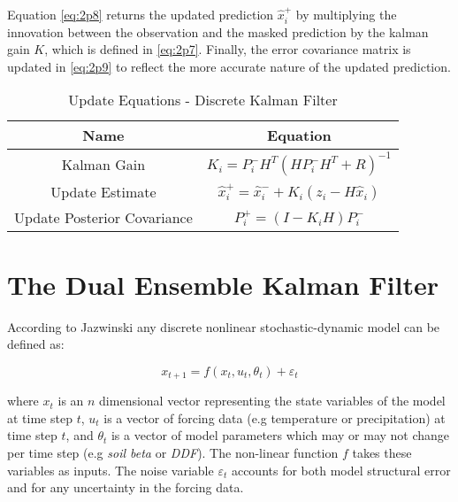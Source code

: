 Equation \eqref{eq:2p8} returns the updated prediction $\hat{x}^{+}_{i}$ by multiplying the innovation between the observation and the masked prediction by the kalman gain $K$, which is defined in \eqref{eq:2p7}. Finally, the error covariance matrix is updated in \eqref{eq:2p9} to reflect the more accurate nature of the updated prediction.

\begin{table}[h]
\caption{Update Equations - Discrete Kalman Filter} 
\centering
\begin{tabular}{c c}
\\ [0.1ex]
\hline
Name & Equation \\ [0.5ex]
\hline            
Kalman Gain & \parbox{3cm}{\begin{equation}\label{eq:2p7}K_{i} = P^{-}_{i}H^{T}(HP^{-}_{i}H^{T} + R)^{-1} \end{equation}} \\
Update Estimate & \parbox{3cm}{\begin{equation}\label{eq:2p8} \hat{x}^{+}_{i} = \hat{x}^{-}_{i} + K_{i}(z_{i}-H\hat{x}_{i}) \end{equation}} \\
Update Posterior Covariance & \parbox{3cm}{\begin{equation}\label{eq:2p9}P^{+}_{i} = (I-K_{i}H)P^{-}_{i} \end{equation}}
\end{tabular}
\label{tab:hresult}
\end{table}


\section{The Dual Ensemble Kalman Filter}

According to Jazwinski \cite{Jazwinski1970} any discrete nonlinear stochastic-dynamic model can be defined as:

\begin{equation}\label{eq:gen_stoc}
x_{t+1} = f(x_{t}, u_{t}, \theta_{t}) + \varepsilon_{t}
\end{equation}

where $x_{t}$ is an $n$ dimensional vector representing the state variables of the model at time step $t$, $u_{t}$ is a vector of forcing data (e.g temperature or precipitation) at time step $t$, and $\theta_{t}$ is a vector of model parameters which may or may not change per time step (e.g \textit{soil beta }or \textit{DDF}). The non-linear function $f$ takes these variables as inputs. The noise variable $\varepsilon_{t}$ accounts for both model structural error and for any uncertainty in the forcing data.

